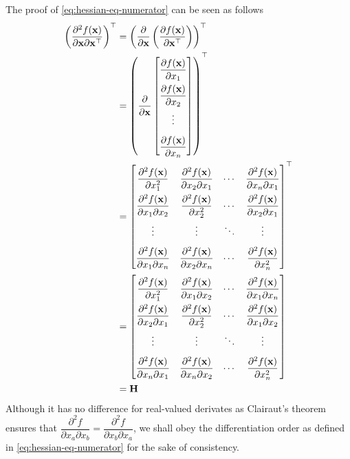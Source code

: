 \documentclass{article}
\begin{document}
The proof of \eqref{eq:hessian-eq-numerator} can be seen as follows
\begin{align}
    \left( \dfrac{\partial^{2} f(\mathbf{x})}{\partial \mathbf{x} \partial \mathbf{x}^\top} \right)^\top & = \left( \dfrac{\partial }{\partial \mathbf{x}}\left( \dfrac{\partial f(\mathbf{x})}{\partial \mathbf{x}^\top} \right) \right)^\top \\
    & = \left( \dfrac{\partial }{\partial \mathbf{x}} \begin{bmatrix}
        \dfrac{\partial f(\mathbf{x})}{\partial x_1}\\
        \dfrac{\partial f(\mathbf{x})}{\partial x_2}\\
        \vdots\\
        \dfrac{\partial f(\mathbf{x})}{\partial x_n}
    \end{bmatrix} \right)^\top\\
    & = \renewcommand{\arraystretch}{2.2}\begin{bmatrix}
        \dfrac{\partial^2 f(\mathbf{x})}{\partial x_1^2} & \dfrac{\partial^2 f(\mathbf{x})}{\partial x_2\partial x_1} & \cdots & \dfrac{\partial^2 f(\mathbf{x})}{\partial x_n\partial x_1}\\
        \dfrac{\partial^2 f(\mathbf{x})}{\partial x_1\partial x_2} & \dfrac{\partial^2 f(\mathbf{x})}{\partial x_2^2} & \cdots & \dfrac{\partial^2 f(\mathbf{x})}{\partial x_2\partial x_1}\\
        \vdots&\vdots& \ddots&\vdots\\
        \dfrac{\partial^2 f(\mathbf{x})}{\partial x_1\partial x_n} & \dfrac{\partial^2 f(\mathbf{x})}{\partial x_2\partial x_n} & \cdots & \dfrac{\partial^2 f(\mathbf{x})}{\partial x_n^2}\\
    \end{bmatrix}^\top \\
    & = \renewcommand{\arraystretch}{2.2}\begin{bmatrix}
        \dfrac{\partial^2 f(\mathbf{x})}{\partial x_1^2} & \dfrac{\partial^2 f(\mathbf{x})}{\partial x_1\partial x_2} & \cdots & \dfrac{\partial^2 f(\mathbf{x})}{\partial x_1\partial x_n}\\
        \dfrac{\partial^2 f(\mathbf{x})}{\partial x_2\partial x_1} & \dfrac{\partial^2 f(\mathbf{x})}{\partial x_2^2} & \cdots & \dfrac{\partial^2 f(\mathbf{x})}{\partial x_1\partial x_2}\\
        \vdots&\vdots& \ddots&\vdots\\
        \dfrac{\partial^2 f(\mathbf{x})}{\partial x_n\partial x_1} & \dfrac{\partial^2 f(\mathbf{x})}{\partial x_n\partial x_2} & \cdots & \dfrac{\partial^2 f(\mathbf{x})}{\partial x_n^2}\\
    \end{bmatrix} \\
    & = \mathbf{H}
\end{align}
Although it has no difference for real-valued derivates as Clairaut's theorem ensures that \cite{stewart2020calculus} \(\dfrac{\partial^{2} f}{\partial x_a \partial x_b} = \dfrac{\partial^{2} f}{\partial x_b \partial x_a}\), we shall obey the differentiation order as defined in \eqref{eq:hessian-eq-numerator} for the sake of consistency.
\end{document}
